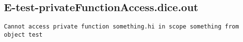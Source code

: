 \subsection{E-test-privateFunctionAccess.dice.out}
\begin{verbatim}
Cannot access private function something.hi in scope something from object test

\end{verbatim}